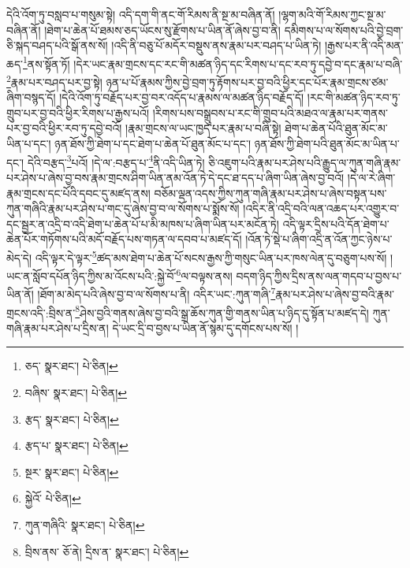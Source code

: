 དེའི་འོག་ཏུ་བསླབ་པ་གསུམ་སྟེ། འདི་དག་གི་ནང་གོ་རིམས་ནི་སྔ་མ་བཞིན་ནོ། །ལྷག་མའི་གོ་རིམས་ཀྱང་སྔ་མ་བཞིན་ནོ། །ཐེག་པ་ཆེན་པོ་ཐམས་ཅད་ཡོངས་སུ་རྫོགས་པ་ཡིན་ནོ་ཞེས་བྱ་བ་ནི། དམིགས་པ་ལ་སོགས་པའི་བྱེ་བྲག་ཅི་སྐད་བཤད་པའི་སྒོ་ནས་སོ། །འདི་ནི་བཅུ་པོ་མདོར་བསྡུས་ནས་རྣམ་པར་བཤད་པ་ཡིན་ཏེ། །རྒྱས་པར་ནི་འདི་མན་ཆད་\footnote{ཅད་  སྣར་ཐང་།  པེ་ཅིན། }ནས་སྟོན་ཏོ། །དེར་ཡང་རྣམ་གྲངས་དང་རང་གི་མཚན་ཉིད་དང་རིགས་པ་དང་རབ་ཏུ་དབྱེ་བ་དང་རྣམ་པ་བཞི་\footnote{བཞིས་  སྣར་ཐང་།  པེ་ཅིན། }རྣམ་པར་བཤད་པར་བྱ་སྟེ། ཉན་པ་པོ་རྣམས་ཀྱིས་བྱེ་བྲག་ཏུ་རྟོགས་པར་བྱ་བའི་ཕྱིར་དང་པོར་རྣམ་གྲངས་ཙམ་ཞིག་བསྙད་དོ། །དེའི་འོག་ཏུ་བརྗོད་པར་བྱ་བར་འདོད་པ་རྣམས་ལ་མཚན་ཉིད་བརྗོད་དོ། །རང་གི་མཚན་ཉིད་རབ་ཏུ་གྲུབ་པར་བྱ་བའི་ཕྱིར་རིགས་པ་རྒྱས་པའོ། །རིགས་པས་བསྒྲུབས་པ་རང་གི་གྲུབ་པའི་མཐའ་ལ་རྣམ་པར་གནས་པར་བྱ་བའི་ཕྱིར་རབ་ཏུ་དབྱེ་བའོ། །རྣམ་གྲངས་ལ་ཡང་ཁྱད་པར་རྣམ་པ་བཞི་སྟེ། ཐེག་པ་ཆེན་པོའི་ཐུན་མོང་མ་ཡིན་པ་དང་། ཉན་ཐོས་ཀྱི་ཐེག་པ་དང་ཐེག་པ་ཆེན་པོ་ཐུན་མོང་པ་དང་། ཉན་ཐོས་ཀྱི་ཐེག་པའི་ཐུན་མོང་མ་ཡིན་པ་དང་། དེའི་བརྩད་\footnote{རྩད་  སྣར་ཐང་།  པེ་ཅིན། }པའོ། །དེ་ལ་:བརྩད་པ་\footnote{རྩད་པ་  སྣར་ཐང་།  པེ་ཅིན། }ནི་འདི་ཡིན་ཏེ། ཅི་འཇུག་པའི་རྣམ་པར་ཤེས་པའི་རྒྱུད་ལ་ཀུན་གཞི་རྣམ་པར་ཤེས་པ་ཞེས་བྱ་བས་རྣམ་གྲངས་ཤིག་ཡིན་ནམ་འོན་ཏེ་དེ་དང་ཐ་དད་པ་ཞིག་ཡིན་ཞེས་བྱ་བའོ། །དེ་ལ་རེ་ཞིག་རྣམ་གྲངས་དང་པོའི་དབང་དུ་མཛད་ནས། བཅོམ་ལྡན་འདས་ཀྱིས་ཀུན་གཞི་རྣམ་པར་ཤེས་པ་ཞེས་བསྟན་པས་ཀུན་གཞིའི་རྣམ་པར་ཤེས་པ་གང་དུ་ཞེས་བྱ་བ་ལ་སོགས་པ་སྨོས་སོ། །འདིར་ནི་འདྲི་བའི་ལན་འཆད་པར་འགྱུར་བ་དང་སྦྱར་ན་འདྲི་བ་འདི་ཐེག་པ་ཆེན་པོ་པ་མི་མཁས་པ་ཞིག་ཡིན་པར་མངོན་ཏེ། འདི་ལྟར་དྲིས་པའི་དོན་ཐེག་པ་ཆེན་པོར་གཏོགས་པའི་མདོ་བརྗོད་པས་གཏན་ལ་དབབ་པ་མཛད་དོ། །འོན་ཏེ་སྡེ་པ་ཞིག་འདྲི་ན་འོན་ཀྱང་ཉེས་པ་མེད་དེ། འདི་ལྟར་དེ་ལྟར་\footnote{སྔར་  སྣར་ཐང་།  པེ་ཅིན། }ཚད་མས་ཐེག་པ་ཆེན་པོ་སངས་རྒྱས་ཀྱི་གསུང་ཡིན་པར་ཁས་ལེན་དུ་བཅུག་པས་སོ། །ཡང་ན་སློབ་དཔོན་ཉིད་ཀྱིས་མ་འོངས་པའི་:སྐྱེ་བོ་\footnote{སྐྱེའོ་  པེ་ཅིན། }ལ་བལྟས་ནས། བདག་ཉིད་ཀྱིས་དྲིས་ནས་ལན་གདབ་པ་བྱས་པ་ཡིན་ནོ། །ཐོག་མ་མེད་པའི་ཞེས་བྱ་བ་ལ་སོགས་པ་ནི། འདིར་ཡང་:ཀུན་གཞི་\footnote{ཀུན་གཞིའི་  སྣར་ཐང་།  པེ་ཅིན། }རྣམ་པར་ཤེས་པ་ཞེས་བྱ་བའི་རྣམ་གྲངས་འདི་:བྲིས་ན་\footnote{བྲིས་ནས་  ཅོ་ནེ། དྲིས་ན་  སྣར་ཐང་།  པེ་ཅིན། }ཤེས་བྱའི་གནས་ཞེས་བྱ་བའི་སྒྲ་ཆོས་ཀུན་གྱི་གནས་ཡིན་པ་ཉིད་དུ་སྟོན་པ་མཛད་དེ། ཀུན་གཞི་རྣམ་པར་ཤེས་པ་དྲིས་ན། དེ་ཡང་དྲི་བ་བྱས་པ་ཡིན་ནོ་སྙམ་དུ་དགོངས་པས་སོ། །
